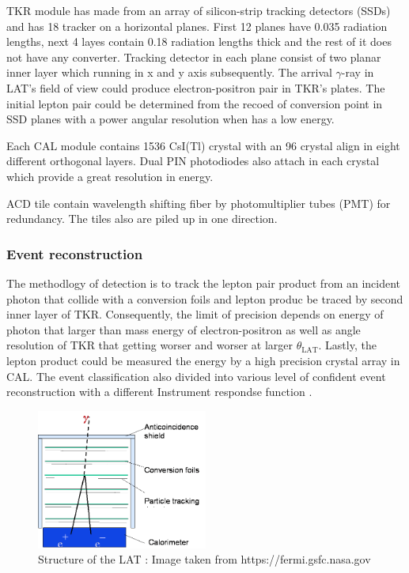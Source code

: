 \par TKR module has made from an array of silicon-strip tracking detectors (SSDs) and has 18 tracker on a horizontal planes. First 12 planes have 0.035 radiation lengths, next 4 layes contain 0.18 radiation lengths thick and the rest of it does not have any converter.
Tracking detector in each plane consist of two planar inner layer which running in x and y axis subsequently. The arrival $\gamma$-ray in LAT's field of view could produce electron-positron pair in TKR's plates.
The initial lepton pair could be determined from the recoed of conversion point in SSD planes with a power angular resolution when has a low energy.

\par Each CAL module contains 1536 CsI(Tl) crystal with an 96 crystal align in eight different orthogonal layers.
Dual PIN photodiodes also attach in each crystal which provide a great resolution in energy.

\par ACD tile contain wavelength shifting fiber by photomultiplier tubes (PMT) for redundancy. 
The tiles also are piled up in one direction.


\subsubsection*{Event reconstruction}
The methodlogy of detection is to track the lepton pair product from an incident photon that collide with a conversion foils and lepton produc be traced by second inner layer of TKR.
Consequently, the limit of precision depends on energy of photon that larger than mass energy of electron-positron as well as angle resolution of TKR that getting worser and worser at larger $\theta_\text{LAT}$.
Lastly, the lepton product could be measured the energy by a high precision crystal array in CAL. The event classification also divided into various level of confident event reconstruction with a different Instrument respondse function \cite{FermiDetail,Atwood:2013rka}.


\begin{figure}[h!]
  \centering
    \includegraphics[width=0.5\textwidth]{img/LATMethodology}
    \caption{Structure of the LAT : Image taken from https://fermi.gsfc.nasa.gov}
  \end{figure}
